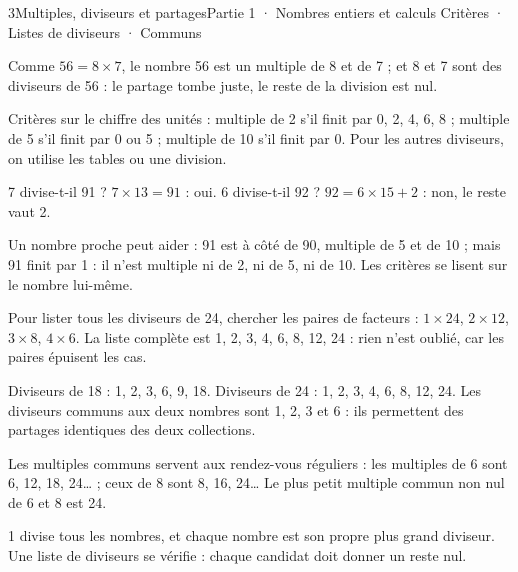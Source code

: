 \begin{ouverture}[calcul]{3}{Multiples, diviseurs et partages}{Partie 1 · Nombres entiers et calculs}
{Critères · Listes de diviseurs · Communs}
\end{ouverture}
\pagestyle{otMain}\essentiel\fontsize{11}{15}\selectfont
{}\label{cours-3-1}
\begin{definition}Comme $56=8\times7$, le nombre 56 est un multiple de 8 et de 7 ; et 8 et 7 sont des diviseurs de 56 : le partage tombe juste, le reste de la division est nul.\end{definition}
\begin{propriete}Critères sur le chiffre des unités : multiple de 2 s’il finit par 0, 2, 4, 6, 8 ; multiple de 5 s’il finit par 0 ou 5 ; multiple de 10 s’il finit par 0. Pour les autres diviseurs, on utilise les tables ou une division.\end{propriete}
\begin{exemple}7 divise-t-il 91 ? $7\times13=91$ : oui. 6 divise-t-il 92 ? $92=6\times15+2$ : non, le reste vaut 2.\end{exemple}
\begin{savoirfaire}Un nombre proche peut aider : 91 est à côté de 90, multiple de 5 et de 10 ; mais 91 finit par 1 : il n’est multiple ni de 2, ni de 5, ni de 10. Les critères se lisent sur le nombre lui-même.\end{savoirfaire}
\clearpage
{}\label{cours-3-2}
\begin{savoirfaire}Pour lister tous les diviseurs de 24, chercher les paires de facteurs : $1\times24$, $2\times12$, $3\times8$, $4\times6$. La liste complète est 1, 2, 3, 4, 6, 8, 12, 24 : rien n’est oublié, car les paires épuisent les cas.\end{savoirfaire}
\begin{exemple}Diviseurs de 18 : 1, 2, 3, 6, 9, 18. Diviseurs de 24 : 1, 2, 3, 4, 6, 8, 12, 24. Les diviseurs communs aux deux nombres sont 1, 2, 3 et 6 : ils permettent des partages identiques des deux collections.\end{exemple}
\begin{propriete}Les multiples communs servent aux rendez-vous réguliers : les multiples de 6 sont 6, 12, 18, 24… ; ceux de 8 sont 8, 16, 24… Le plus petit multiple commun non nul de 6 et 8 est 24.\end{propriete}
\begin{attention}1 divise tous les nombres, et chaque nombre est son propre plus grand diviseur. Une liste de diviseurs se vérifie : chaque candidat doit donner un reste nul.\end{attention}

